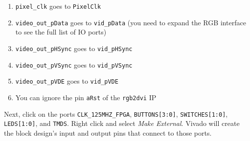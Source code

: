 \documentclass[11pt]{article}
\begin{document}
\begin{enumerate}
\item \texttt{pixel\_clk} goes to \texttt{PixelClk}
\item \texttt{video\_out\_pData} goes to \texttt{vid\_pData} (you need to expand the RGB interface to see the full list of IO ports)
\item \texttt{video\_out\_pHSync} goes to \texttt{vid\_pHSync}
\item \texttt{video\_out\_pVSync} goes to \texttt{vid\_pVSync}
\item \texttt{video\_out\_pVDE} goes to \texttt{vid\_pVDE}
\item You can ignore the pin \texttt{aRst} of the \texttt{rgb2dvi} IP
\end{enumerate}

\begin{center}
\end{center}

Next, click on the ports \texttt{CLK\_125MHZ\_FPGA}, \texttt{BUTTONS[3:0]}, \texttt{SWITCHES[1:0]}, \texttt{LEDS[1:0]}, and \texttt{TMDS}. Right click and select
\emph{Make External}. Vivado will create the block design's input and output pins that connect to those ports.

\begin{center}
\end{center}
\end{document}
